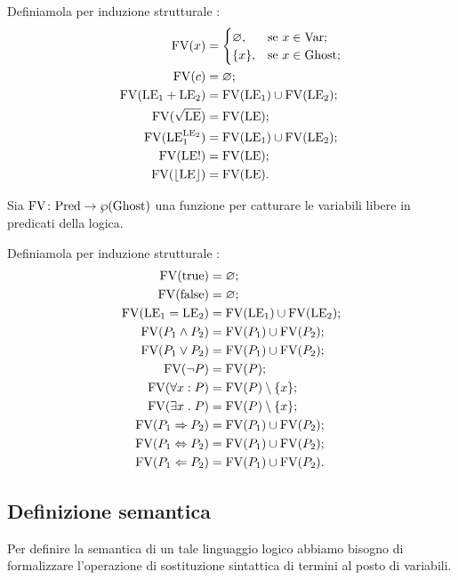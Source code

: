 Definiamola per induzione strutturale :
\begin{align*}
   \mathrm{FV}(x)
      &=
        \begin{cases}
            \varnothing,&\text{se $x  \in \mathrm{Var}$};\\
            \{x\},    &\text{se $x  \in \mathrm{Ghost}$};
        \end{cases} \\
   \mathrm{FV}(c)
      &= \varnothing;\\
   \mathrm{FV}(\mathrm{LE}_1 + \mathrm{LE}_2)
      &= \mathrm{FV}(\mathrm{LE}_1) \cup \mathrm{FV}(\mathrm{LE}_2);\\
   \mathrm{FV}(\sqrt{\mathrm{LE}})
      &= \mathrm{FV}(\mathrm{LE});\\
   \mathrm{FV}(\mathrm{LE}_1^{\mathrm{LE}_2})
      &= \mathrm{FV}(\mathrm{LE}_1) \cup \mathrm{FV}(\mathrm{LE}_2);\\
   \mathrm{FV}(\mathrm{LE}!)
      &= \mathrm{FV}(\mathrm{LE});\\
   \mathrm{FV}(\lfloor \mathrm{LE} \rfloor)
      &= \mathrm{FV}(\mathrm{LE}).
\end{align*}

Sia $\mathord{\mathrm{FV}}\colon\mathrm{Pred}\to\wp(\mathrm{Ghost})$ una funzione per catturare le variabili libere in predicati della logica.

Definiamola per induzione strutturale :
\begin{align*}
   \mathrm{FV}(\mathrm{true})
      &= \varnothing;\\
   \mathrm{FV}(\mathrm{false})
      &= \varnothing;\\
   \mathrm{FV}(\mathrm{LE}_1 = \mathrm{LE}_2)
      &= \mathrm{FV}(\mathrm{LE}_1) \cup \mathrm{FV}(\mathrm{LE}_2);\\
   \mathrm{FV}(P_1 \land P_2)
      &= \mathrm{FV}(P_1) \cup \mathrm{FV}(P_2);\\
   \mathrm{FV}(P_1 \lor P_2)
      &= \mathrm{FV}(P_1) \cup \mathrm{FV}(P_2);\\
   \mathrm{FV}(\neg P)
      &= \mathrm{FV}(P);\\
   \mathrm{FV}(\forall x \mathrel{:} P)
      &= \mathrm{FV}(P)\setminus \{x\};\\
   \mathrm{FV}(\exists x \mathrel{.} P)
      &= \mathrm{FV}(P)\setminus \{x\};\\
   \mathrm{FV}(P_1 \Rightarrow P_2)
      &= \mathrm{FV}(P_1) \cup \mathrm{FV}(P_2);\\
   \mathrm{FV}(P_1 \Leftrightarrow P_2)
      &= \mathrm{FV}(P_1) \cup \mathrm{FV}(P_2);\\
   \mathrm{FV}(P_1 \Leftarrow P_2)
      &= \mathrm{FV}(P_1) \cup \mathrm{FV}(P_2).
\end{align*}

\subsection{Definizione semantica}
Per definire la semantica di un tale linguaggio logico abbiamo bisogno
di formalizzare l'operazione di sostituzione sintattica di termini
al posto di variabili.

